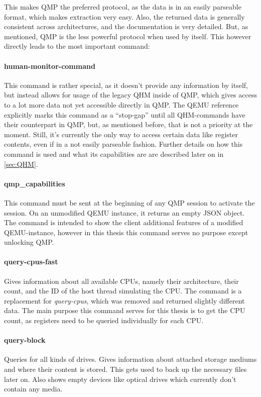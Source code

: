 This makes QMP the preferred protocol, as the data is in an easily parseable format, which makes extraction very easy.
Also, the returned data is generally consistent across architectures, and the documentation is very detailed.
But, as mentioned, QMP is the less powerful protocol when used by itself.
This however directly leads to the most important command\cite{qmp-commands}:

\paragraph{human-monitor-command}
This command is rather special, as it doesn't provide any information by itself,
but instead allows for usage of the legacy QHM inside of QMP,
which gives access to a lot more data not yet accessible directly in QMP.
The QEMU reference explicitly marks this command as a \enquote{stop-gap} until all QHM-commands have their counterpart in QMP,
but, as mentioned before, that is not a priority at the moment.
Still, it's currently the only way to access certain data like register contents, even if in a not easily parseable fashion.
Further details on how this command is used and what its capabilities are are described later on in \autoref{sec:QHM}.

\paragraph{qmp\_capabilities}
This command must be sent at the beginning of any QMP session to activate the session.
On an unmodified QEMU instance, it returns an empty JSON object.
The command is intended to show the client additional features of a modified QEMU-instance,
however in this thesis this command serves no purpose except unlocking QMP.

\paragraph{query-cpus-fast}
Gives information about all available CPUs, namely their architecture,
their count, and the ID of the host thread simulating the CPU.
The command is a replacement for \emph{query-cpus}, which was removed and returned slightly different data.
The main purpose this command serves for this thesis is to get the CPU count,
as registers need to be queried individually for each CPU.

\paragraph{query-block}
Queries for all kinds of drives. Gives information about attached storage mediums and where their content is stored.
This gets used to back up the necessary files later on.
Also shows empty devices like optical drives which currently don't contain any media.

